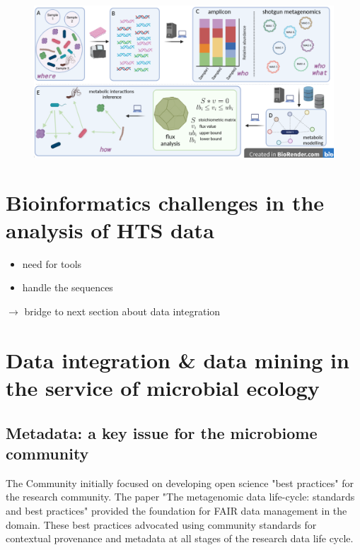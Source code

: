       \begin{figure}[h]
         \centering
         \includegraphics[width=135mm]{figures/Selection_935.png}
         \caption[Reverse ecology approach]{}
      \end{figure}

   







\section{Bioinformatics challenges in the analysis of HTS data}
      
      
   \begin{itemize}
      \item need for tools 
      \item handle the sequences 
   \end{itemize}


   $\longrightarrow$ bridge to next section about data integration


\section{Data integration \& data mining in the service of microbial ecology}


\subsection{Metadata: a key issue for the microbiome community}

   The Community initially focused on developing open science "best practices" for the research community. 
   The paper "The metagenomic data life-cycle: standards and best practices" \citep{ten2017metagenomic} provided the foundation for FAIR data management in the domain. 
   These best practices advocated using community standards for contextual provenance and metadata at all stages of the research data life cycle.

